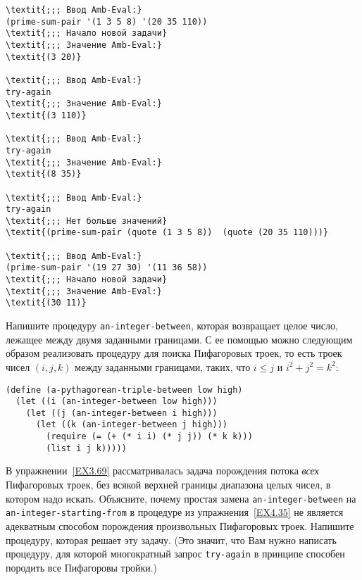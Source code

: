 \begin{Verbatim}[fontsize=\small]
\textit{;;; Ввод Amb-Eval:}
(prime-sum-pair '(1 3 5 8) '(20 35 110))
\textit{;;; Начало новой задачи}
\textit{;;; Значение Amb-Eval:}
\textit{(3 20)}

\textit{;;; Ввод Amb-Eval:}
try-again
\textit{;;; Значение Amb-Eval:}
\textit{(3 110)}

\textit{;;; Ввод Amb-Eval:}
try-again
\textit{;;; Значение Amb-Eval:}
\textit{(8 35)}

\textit{;;; Ввод Amb-Eval:}
try-again
\textit{;;; Нет больше значений}
\textit{(prime-sum-pair (quote (1 3 5 8))  (quote (20 35 110)))}

\textit{;;; Ввод Amb-Eval:}
(prime-sum-pair '(19 27 30) '(11 36 58))
\textit{;;; Начало новой задачи}
\textit{;;; Значение Amb-Eval:}
\textit{(30 11)}
\end{Verbatim}

\begin{exercise}{4.35}%
\label{EX4.35}%
Напишите процедуру {\tt an-integer-between},
которая возвращает целое число, лежащее между двумя заданными
границами.  С ее помощью можно следующим образом реализовать процедуру
для поиска Пифагоровых троек, то есть троек чисел $(i, j, k)$ 
между заданными границами, таких, что $i \leq j$ и 
$i^2 + j^2 = k^2$:

\begin{Verbatim}[fontsize=\small]
(define (a-pythagorean-triple-between low high)
  (let ((i (an-integer-between low high)))
    (let ((j (an-integer-between i high)))
      (let ((k (an-integer-between j high)))
        (require (= (+ (* i i) (* j j)) (* k k)))
        (list i j k)))))
\end{Verbatim}
\end{exercise}

\begin{exercise}{4.36}\label{EX4.36}%
В упражнении~\ref{EX3.69} рассматривалась
задача порождения потока {\em всех} Пифагоровых троек, без
всякой верхней границы диапазона целых чисел, в котором надо искать.
Объясните, почему простая замена {\tt an-integer-between} на
{\tt an-integer-starting-from} в процедуре из %
упражнения~\ref{EX4.35} не является адекватным способом порождения
произвольных Пифагоровых троек.  Напишите процедуру, которая решает
эту задачу. (Это значит, что Вам нужно написать процедуру, для которой
многократный запрос {\tt try-again} в принципе способен
породить все Пифагоровы тройки.)
\end{exercise}

